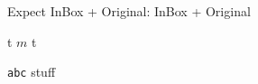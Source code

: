\documentclass{article}
\begin{document}
\def\foo{Original}
Expect InBox + Original: \hbox{\def\foo{InBox}\foo} + \foo

t $m$ t

\verb|abc| stuff
\end{document}
